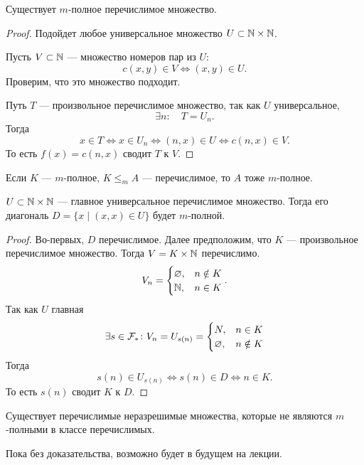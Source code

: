 \begin{thm}
    Существует $ m$-полное перечислимое множество.
\end{thm}
\begin{proof}
    Подойдет любое универсальное множество $ U \subset \mathbb{N} \times \mathbb{N}$.

	Пусть $ V \subset \mathbb{N}$ --- множество номеров пар из  $ U$:
	 \[
		 c(x, y) \in V  \Longleftrightarrow (x, y) \in U
	.\] 
	Проверим, что это множество подходит.

	Путь $ T$ --- произвольное перечислимое множество, так как $ U$ универсальное, 
	\[
	\exists n \colon \quad T = U_n
	.\] 
	Тогда
	\[
		x \in T \Longleftrightarrow x \in U_n \Longleftrightarrow (n, x) \in U \Longleftrightarrow  c(n, x) \in V
	.\] 
	То есть $ f(x) = c(n, x)$ сводит $ T $ к $ V$.
\end{proof}


\begin{note}
    Если $ K$ --- $ m$-полное,  $ K \le _{m} A$ --- перечислимое, то $ A$ тоже $ m$-полное. 
\end{note}


\begin{thm}
	$ U \subset \mathbb{N} \times \mathbb{N}$ --- главное универсальное перечислимое множество. Тогда его диагональ $ D = \{x \mid (x, x) \in  U\}$ будет $ m$-полной.
\end{thm}
\begin{proof}
    Во-первых, $ D$ перечислимое. Далее предположим, что $ K$ --- произвольное перечислимое множество. Тогда $ V = K \times \mathbb{N}$  перечислимо.
	\[
	V_n = \begin{cases}
		\varnothing, & n \notin K \\
		\mathbb{N} , & n \in K
	\end{cases}
	.\] 
	Так как $ U$ главная 
	$$ \exists s \in \mathcal{F}_{*}\colon V_n=U_{s(n)} = \begin{cases}
		N, &n \in K \\
		\varnothing, & n \notin K
	\end{cases}
	$$
	Тогда 
	\[
		s(n) \in U_{s(n)} \Longleftrightarrow s(n) \in D \Longleftrightarrow n \in K
	.\] 
	То есть $ s(n)$ сводит  $ K $ к $ D$.
\end{proof}


\begin{st}
	Существует перечислимые неразрешимые множества, которые не являются $ m$-полными в классе перечислимых.
\end{st}
\begin{proof*}
    Пока без доказательства, возможно будет в будущем на лекции.
\end{proof*}


